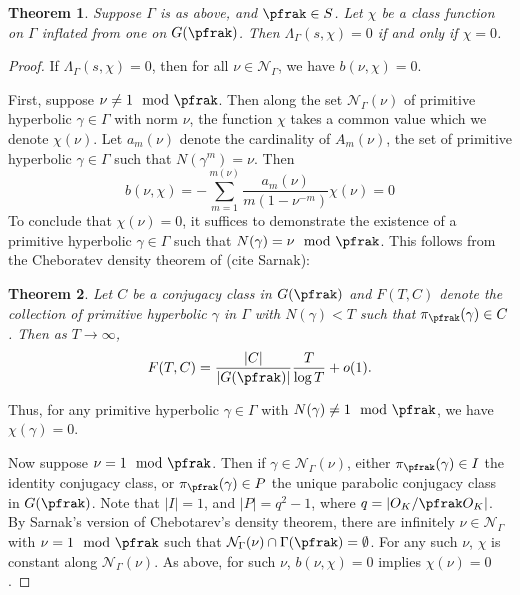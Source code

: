 \documentclass[11pt]{amsart}
\theoremstyle{definition}
\theoremstyle{plain}
\newtheorem{thm}{Theorem}
\theoremstyle{remark}
\begin{document}
\begin{thm}
	Suppose $\Gamma$  is as above, and $\pfrak \in S$.
	Let $\chi$ be a class function on $\Gamma$ inflated from one on $G(\pfrak)$.
	Then $\Lambda_{\Gamma}(s,\chi)=0$ if and only if $\chi=0$.
\end{thm}
\begin{proof}
	If $\Lambda_{\Gamma}(s,\chi)=0$, then for all $\nu \in \mathcal{N}_{\Gamma}$, we have $b(\nu,\chi)=0$.

	First, suppose $\nu\neq 1 \mod \pfrak$.
	Then along the set $\mathcal{N}_{\Gamma}(\nu)$ of primitive hyperbolic $\gamma \in \Gamma$ with norm $\nu$, the function $\chi$ takes a common value which we denote $\chi(\nu)$.
	Let $a_{m}(\nu)$ denote the cardinality of $A_{m}(\nu)$, the set of primitive hyperbolic $\gamma \in \Gamma$ such that $N(\gamma^{m})=\nu$.
	Then
	\[
		b(\nu,\chi)=-\sum_{m=1}^{m(\nu)}\frac{a_{m}(\nu)}{m(1-\nu^{-m})}\chi(\nu)=0
	\]
	To conclude that $\chi(\nu)=0$, it suffices to demonstrate the existence of a primitive hyperbolic $\gamma \in \Gamma$ such that $N(\gamma)= \nu \mod \pfrak$.
	This follows from the Cheboratev density theorem of (cite Sarnak):

	\begin{thm}
		Let $C$ be a conjugacy class in $G(\pfrak)$ and $F(T,C)$ denote the collection of primitive hyperbolic $\gamma$ in $\Gamma$ with $N(\gamma)<T$ such that $\pi_{\pfrak}(\gamma) \in C$.
		Then as $T \to \infty$,
		\[F(T,C) = \frac{|C|}{|G(\pfrak)|} \frac{T}{\log T} +o(1).\]
	\end{thm}

	Thus, for any primitive hyperbolic $\gamma \in \Gamma$ with $N(\gamma)\neq 1 \mod \pfrak$, we have $\chi(\gamma)=0$.

	Now suppose $\nu =1 \mod \pfrak$.
	Then if $\gamma \in \mathcal{N}_{\Gamma}(\nu)$, either $\pi_{\pfrak}(\gamma) \in I$ the identity conjugacy class, or $\pi_{\pfrak}(\gamma) \in P$ the unique parabolic conjugacy class in $G(\pfrak)$.
	Note that $|I|=1$, and $|P|=q^{2}-1$, where $q= |O_{K}/\pfrak O_{K}|$.
	By Sarnak's version of Chebotarev's density theorem, there are infinitely $\nu \in \mathcal{N}_{\Gamma}$  with $\nu=1 \mod \pfrak$ such that $\mathcal{N}_{\Gamma}(\nu)\cap \Gamma(\pfrak) =\emptyset$.
	For any such $\nu$, $\chi$ is constant along $\mathcal{N}_{\Gamma}(\nu)$.
	As above, for such $\nu$, $b(\nu,\chi)=0$ implies $\chi(\nu)=0$.

\end{proof}





{}

\end{document}
